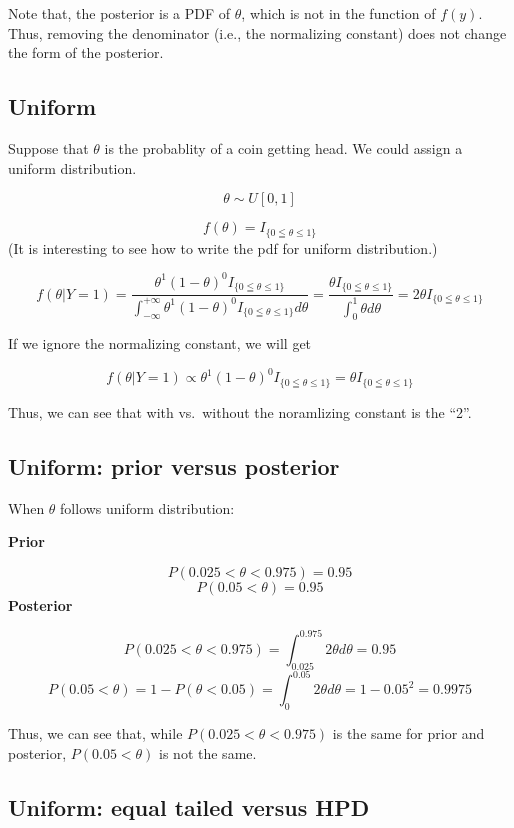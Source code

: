 \documentclass[]{book}
\begin{document}
Note that, the posterior is a PDF of \(\theta\), which is not in the
function of \(f(y)\). Thus, removing the denominator (i.e., the
normalizing constant) does not change the form of the posterior.

\subsection{Uniform}\label{uniform}

Suppose that \(\theta\) is the probablity of a coin getting head. We
could assign a uniform distribution.

\[\theta \sim U[0,1]\]

\[f(\theta)=I_{ \{0 \leqq \theta \leqslant 1 \}}\] (It is interesting to
see how to write the pdf for uniform distribution.)

\[f(\theta | Y=1)= \frac{\theta^1(1-\theta)^0 I_{\{0 \leqq \theta \leqslant 1\}}}{\int_{-\infty}^{+\infty} \theta^1(1-\theta)^0 I_{\{0 \leqq \theta \leqslant 1\}} d\theta}=\frac{\theta I_{\{0 \leqq \theta \leqslant 1 \}}}{\int_0^1 \theta d\theta}=2\theta I_{ \{0 \leqq \theta \leqslant 1\}}\]

If we ignore the normalizing constant, we will get

\[f(\theta | Y=1) \propto \theta^1(1-\theta)^0 I_{ \{0 \leqq \theta \leqslant 1\} }=\theta I_{ \{0 \leqq \theta \leqslant 1\} }\]

Thus, we can see that with vs.~without the noramlizing constant is the
``2''.

\subsection{Uniform: prior versus
posterior}\label{uniform-prior-versus-posterior}

When \(\theta\) follows uniform distribution:

\textbf{Prior}

\[P(0.025 <\theta<0.975)=0.95\] \[P( 0.05< \theta )=0.95\]
\textbf{Posterior}

\[P(0.025<\theta<0.975)=\int_{0.025}^{0.975} 2\theta d\theta=0.95\]
\[P(0.05<\theta)=1-P(\theta <0.05)=\int_{0}^{0.05} 2\theta d\theta=1-0.05^2=0.9975\]

Thus, we can see that, while \(P(0.025<\theta<0.975)\) is the same for
prior and posterior, \(P(0.05<\theta)\) is not the same.

\subsection{Uniform: equal tailed versus
HPD}\label{uniform-equal-tailed-versus-hpd}
\end{document}
